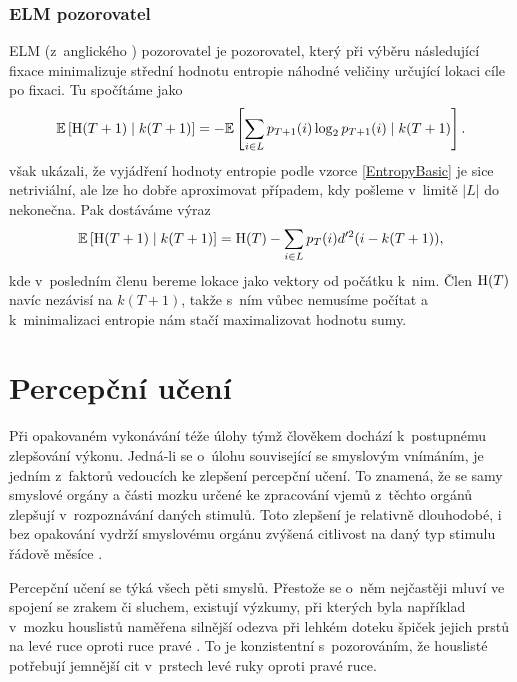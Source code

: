 \subsubsection{ELM pozorovatel}

ELM (z~anglického ) pozorovatel je
pozorovatel, který při výběru následující fixace minimalizuje střední hodnotu
entropie náhodné veličiny určující lokaci cíle po fixaci. Tu spočítáme jako
\begin{equation}\label{EntropyBasic}\mathbb{E}\left[\operatorname{H}(T+1)\mid k(T+1)\right]=-\mathbb{E}\left[\displaystyle\sum_{i\in
L}p_{T+1}(i)\log_2p_{T+1}(i)\mid k(T+1)\right].\end{equation} \citet{Najemnik09} však ukázali,
že vyjádření hodnoty entropie podle vzorce \eqref{EntropyBasic} je sice
netriviální, ale lze ho dobře aproximovat případem, kdy pošleme v~limitě $|L|$
do nekonečna. Pak dostáváme výraz $$ \mathbb{E}\left[\operatorname{H}(T+1)\mid k(T+1)\right]= \operatorname{H}(T) -
\displaystyle\sum_{i\in L} p_T(i)d'^2(i-k(T+1)),$$ kde v~posledním členu bereme
lokace jako vektory od počátku k~nim. Člen $\operatorname{H}(T)$ navíc nezávisí na $k(T+1)$,
takže s~ním vůbec nemusíme počítat a k~minimalizaci entropie nám stačí
maximalizovat hodnotu sumy.


\section{Percepční učení}

Při opakovaném vykonávání téže úlohy týmž člověkem dochází k~postupnému
zlepšování výkonu. Jedná-li se o~úlohu související se smyslovým vnímáním, je
jedním z~faktorů vedoucích ke zlepšení percepční učení. To znamená, že se samy
smyslové orgány a části mozku určené ke zpracování vjemů z~těchto orgánů
zlepšují v~rozpoznávání daných stimulů. Toto zlepšení je relativně dlouhodobé,
i bez opakování vydrží smyslovému orgánu zvýšená citlivost na daný typ stimulu
řádově měsíce \citep{uceni2}.

Percepční učení se týká všech pěti smyslů. Přestože se o~něm nejčastěji mluví
ve spojení se zrakem či sluchem, existují výzkumy, při kterých byla například v~mozku
houslistů naměřena silnější odezva při lehkém doteku špiček jejich prstů na levé ruce oproti ruce pravé \citep{violinists}. To je konzistentní s~pozorováním,
že houslisté potřebují jemnější cit v~prstech levé ruky oproti pravé ruce.

